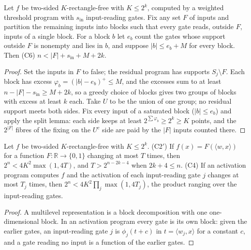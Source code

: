 \begin{theorem}
  \label{thm:lowerbounds-threshold-excess}
  \leanok
  Let $f$ be two-sided $K$-rectangle-free with $K\le2^k$, computed by a
  weighted threshold program with $s_{\mathrm{in}}$ input-reading gates. Fix
  any set $F$ of inputs and partition the remaining inputs into blocks such
  that every gate reads, outside $F$, inputs of a single block. For a block
  $b$ let $e_b$ count the gates whose support outside $F$ is nonempty and lies
  in $b$, and suppose $|b|\le e_b+M$ for every block. Then (C6)
  $n<|F|+s_{\mathrm{in}}+M+2k$.
\end{theorem}
\begin{proof}
  \leanok
  Set the inputs in $F$ to false; the residual program has supports $S_j\setminus F$.
  Each block has excess $\varphi_b=(|b|-e_b)^+\le M$, and the excesses sum to
  at least $n-|F|-s_{\mathrm{in}}\ge M+2k$, so a greedy choice of blocks gives
  two groups of blocks with excess at least $k$ each. Take $U$ to be the union
  of one group; no residual support meets both sides. Fix every input of a
  saturated block ($|b|\le e_b$) and apply the split lemma: each side keeps at
  least $2^{\sum\varphi_b}\ge2^k\ge K$ points, and the $2^{|F|}$ fibres of the
  fixing on the $U^c$ side are paid by the $|F|$ inputs counted there.
\end{proof}

\begin{corollary}
  \label{cor:lowerbounds-threshold-multilevel-mixed}
  \leanok
  Let $f$ be two-sided $K$-rectangle-free with $K\le2^k$. (C2$'$) If
  $f(x)=F(\langle w,x\rangle)$ for a function $F:\mathbb{R}\to\{0,1\}$ changing at
  most $T$ times, then $2^n<4K^2\max(1,4T)$, and $T>2^{n-2k-4}$ when $2k+4\le n$.
  (C4) If an activation program computes $f$ and the activation of each
  input-reading gate $j$ changes at most $T_j$ times, then
  $2^n<4K^2\prod_j\max(1,4T_j)$, the product ranging over the input-reading gates.
\end{corollary}
\begin{proof}
  \leanok
  A multilevel representation is a block decomposition with one one-dimensional
  block. In an activation program every gate is its own block: given the earlier
  gates, an input-reading gate $j$ is $\phi_j(t+c)$ in $t=\langle w_j,x\rangle$ for
  a constant $c$, and a gate reading no input is a function of the earlier gates.
\end{proof}

